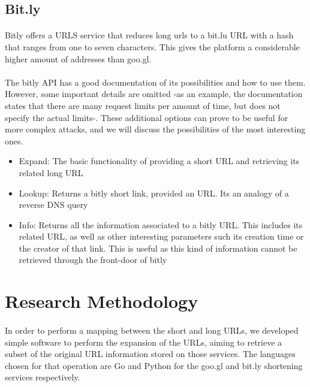 \documentclass[12pt]{article}
\begin{document}
\subsection{Bit.ly}

\paragraph{}
Bitly offers a URLS service that reduces long urls to a bit.lu URL with a hash that ranges from one to seven characters. This gives the platform a considerable higher amount of addresses than goo.gl.

\paragraph{}
The bitly API has a good documentation of its possibilities and how to use them. However, some important details are omitted -as an example, the documentation states that there are many request limits per amount of time, but does not specify the actual limits-. These additional options can prove to be useful for more complex attacks, and we will discuss the possibilities of the most interesting ones.

\begin{itemize}

\item {Expand: The basic functionality of providing a short URL and retrieving its related long URL}
\item{Lookup: Returns a bitly short link, provided an URL. Its an analogy of a reverse DNS query}
\item {Info: Returns all the information associated to a bitly URL. This includes its related URL, as  well as other interesting parameters such its creation time or the creator of that link. This is useful as this kind of information cannot be retrieved through the front-door of bitly}
\end{itemize}


\newpage
\section{Research Methodology}

\paragraph{}
In order to perform a mapping between the short and long URLs, we developed simple software to perform the expansion of the URLs, aiming to retrieve a subset of the original URL information stored on those services. The languages chosen for that operation are Go and Python for the goo.gl and bit.ly shortening services respectively. 
\end{document}
